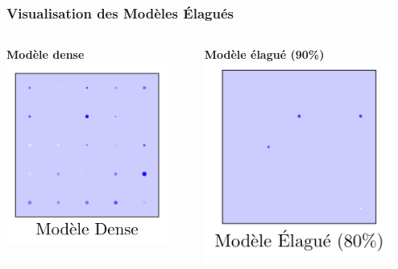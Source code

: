 \documentclass[10pt]{beamer}
\begin{document}
\begin{frame}
\frametitle{Visualisation des Modèles Élagués}
\begin{columns}
\begin{column}{0.5\textwidth}
\centering
\textbf{Modèle dense}
\includegraphics[width=0.9\textwidth]{dense_weights.png}
\end{column}
\begin{column}{0.5\textwidth}
\centering
\textbf{Modèle élagué (90\%)}
\includegraphics[width=0.9\textwidth]{sparse_weights.png}
\end{column}
\end{columns}
\end{frame}
\end{document}
